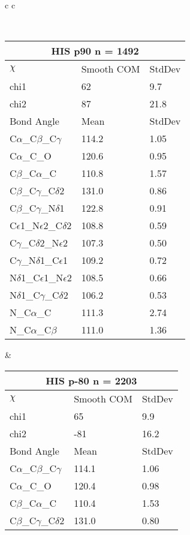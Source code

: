 \newpage

\begin{longtable}{ c c }

\caption{HIS Central Values}\\
  \begin{tabular}{ l l l }
  \toprule
  \multicolumn{3}{c}{HIS \textbf{p90} n = 1492} \\ \toprule
  $\chi$       & Smooth COM & StdDev \\ \midrule
  chi1 & 62 & 9.7 \\ 
  chi2 & 87 & 21.8 \\ \midrule
  Bond Angle   & Mean     & StdDev \\ \midrule
  C$\alpha$\_C$\beta$\_C$\gamma$ & 114.2 & 1.05\\
  C$\alpha$\_C\_O & 120.6 & 0.95\\
  C$\beta$\_C$\alpha$\_C & 110.8 & 1.57\\
  C$\beta$\_C$\gamma$\_C$\delta$2 & 131.0 & 0.86\\
  C$\beta$\_C$\gamma$\_N$\delta$1 & 122.8 & 0.91\\
  C$\epsilon$1\_N$\epsilon$2\_C$\delta$2 & 108.8 & 0.59\\
  C$\gamma$\_C$\delta$2\_N$\epsilon$2 & 107.3 & 0.50\\
  C$\gamma$\_N$\delta$1\_C$\epsilon$1 & 109.2 & 0.72\\
  N$\delta$1\_C$\epsilon$1\_N$\epsilon$2 & 108.5 & 0.66\\
  N$\delta$1\_C$\gamma$\_C$\delta$2 & 106.2 & 0.53\\
  N\_C$\alpha$\_C & 111.3 & 2.74\\
  N\_C$\alpha$\_C$\beta$ & 111.0 & 1.36\\
  \bottomrule
  \end{tabular}
  &
  \begin{tabular}{ l l l }
  \toprule
  \multicolumn{3}{c}{HIS \textbf{p-80} n = 2203} \\ \toprule
  $\chi$       & Smooth COM & StdDev \\ \midrule
  chi1 & 65 & 9.9 \\ 
  chi2 & -81 & 16.2 \\ \midrule
  Bond Angle   & Mean     & StdDev \\ \midrule
  C$\alpha$\_C$\beta$\_C$\gamma$ & 114.1 & 1.06\\
  C$\alpha$\_C\_O & 120.4 & 0.98\\
  C$\beta$\_C$\alpha$\_C & 110.4 & 1.53\\
  C$\beta$\_C$\gamma$\_C$\delta$2 & 131.0 & 0.80\\

\end{tabular}
\end{longtable}
